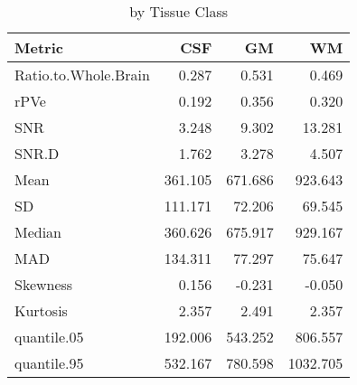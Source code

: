 \documentclass[]{article}
\begin{document}
\begin{table}

\caption{\label{tab:unnamed-chunk-3}by Tissue Class}
\centering
\fontsize{10}{12}\selectfont
\begin{tabular}[t]{l|r|r|r}
\hline
Metric & CSF & GM & WM\\
\hline
Ratio.to.Whole.Brain & 0.287 & 0.531 & 0.469\\
\hline
rPVe & 0.192 & 0.356 & 0.320\\
\hline
SNR & 3.248 & 9.302 & 13.281\\
\hline
SNR.D & 1.762 & 3.278 & 4.507\\
\hline
Mean & 361.105 & 671.686 & 923.643\\
\hline
SD & 111.171 & 72.206 & 69.545\\
\hline
Median & 360.626 & 675.917 & 929.167\\
\hline
MAD & 134.311 & 77.297 & 75.647\\
\hline
Skewness & 0.156 & -0.231 & -0.050\\
\hline
Kurtosis & 2.357 & 2.491 & 2.357\\
\hline
quantile.05 & 192.006 & 543.252 & 806.557\\
\hline
quantile.95 & 532.167 & 780.598 & 1032.705\\
\hline
\end{tabular}
\end{table}
\end{document}
